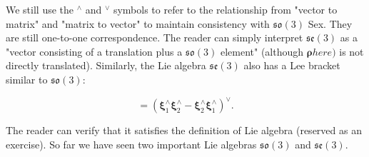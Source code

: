 We still use the $^\wedge$ and $^\vee$ symbols to refer to the relationship from "vector to matrix" and "matrix to vector" to maintain consistency with $\mathfrak{so}(3)$ Sex. They are still one-to-one correspondence. The reader can simply interpret $\mathfrak{se}(3)$ as a "vector consisting of a translation plus a $\mathfrak{so}(3)$ element" (although $\boldsymbol{\rho} here) $ is not directly translated). Similarly, the Lie algebra $\mathfrak{se}(3)$ also has a Lee bracket similar to $\mathfrak{so}(3)$:

\begin{equation}
[ \boldsymbol{\xi}_1, \boldsymbol{\xi}_2 ] = \left( \boldsymbol{\xi}_1^\wedge \boldsymbol{\xi}_2^\wedge -\boldsymbol{\xi}_2^ \wedge \boldsymbol{\xi}_1^\wedge \right) ^\vee.
\end{equation}

The reader can verify that it satisfies the definition of Lie algebra (reserved as an exercise). So far we have seen two important Lie algebras $\mathfrak{so}(3)$ and $\mathfrak{se}(3)$.
